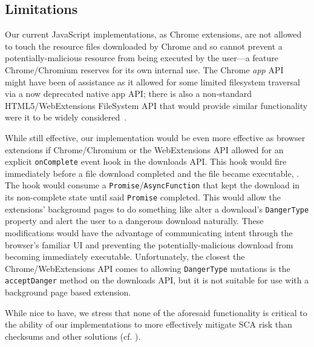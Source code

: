 \subsection{Limitations}


Our current JavaScript implementations, as Chrome extensions, are not allowed to
touch the resource files downloaded by Chrome and so cannot prevent a
potentially-malicious resource from being executed by the user---a feature
Chrome/Chromium reserves for its own internal use. The Chrome \textit{app}
API~\cite{AppAPI} might have been of assistance as it allowed for some limited
filesystem traversal via a now deprecated native app API; there is also a
non-standard HTML5/WebExtensions FileSystem API that would provide similar
functionality were it to be widely considered~\cite{deadSpec}.

While still effective, our implementation would be even more effective as
browser extensions if Chrome/Chromium or the WebExtensions API allowed for an
explicit \texttt{onComplete} event hook in the downloads API. This hook would
fire immediately before a file download completed and the file became
executable, . The hook would consume a \texttt{Promise}/\texttt{AsyncFunction} that
kept the download in its non-complete state until said \texttt{Promise}
completed. This would allow the extensions' background pages to do something
like alter a download's \texttt{DangerType} property and alert the user to a
dangerous download naturally. These modifications would have the advantage of
communicating intent through the browser's familiar UI and preventing the
potentially-malicious download from becoming immediately executable.
Unfortunately, the closest the Chrome/WebExtensions API comes to allowing
\texttt{DangerType} mutations is the \texttt{acceptDanger} method on the
downloads API, but it is not suitable for use with a background page based
extension.

While nice to have, we stress that none of the aforesaid functionality is
critical to the ability of our implementations to more effectively mitigate SCA
risk than checksums and other solutions (cf. ).



